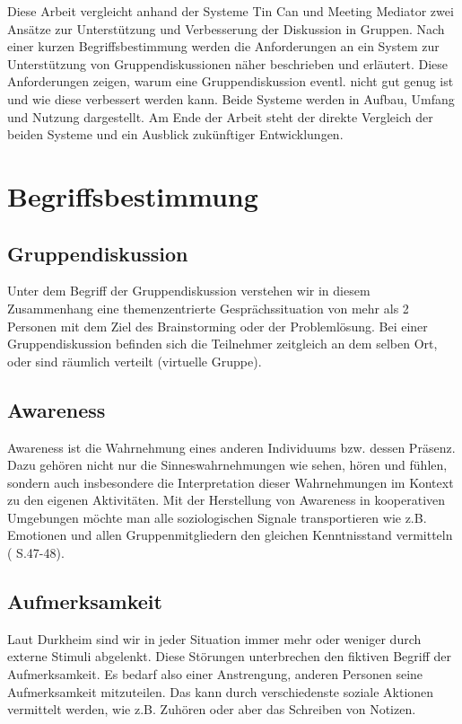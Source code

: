 \documentclass{seminarvorlage}
\begin{document}
Diese Arbeit vergleicht anhand der Systeme Tin Can \cite{HarGorSch2012} und
Meeting Mediator \cite{KimChaHolPent2008} zwei Ansätze zur Unterstützung und
Verbesserung der Diskussion in Gruppen.
Nach einer kurzen Begriffsbestimmung werden die Anforderungen an ein System zur
Unterstützung von Gruppendiskussionen näher beschrieben und erläutert. Diese
Anforderungen zeigen, warum eine Gruppendiskussion eventl.
nicht gut genug ist und wie diese verbessert werden kann. Beide Systeme werden
in Aufbau, Umfang und Nutzung dargestellt. Am Ende der Arbeit steht der
direkte Vergleich der beiden Systeme und ein Ausblick zu\-künf\-ti\-ger
Entwicklungen.


\section{Begriffsbestimmung}
\subsection{Gruppendiskussion}
Unter dem Begriff der Gruppendiskussion verstehen wir in diesem Zusammenhang
eine themenzentrierte Ge\-sprächs\-situa\-tion von mehr als 2 Personen mit dem
Ziel des Brainstorming oder der Problemlösung. Bei einer Gruppendiskussion befinden
sich die Teilnehmer zeitgleich an dem selben Ort, oder sind räumlich verteilt
(virtuelle Gruppe).

\subsection{Awareness}
Awareness ist die Wahrnehmung eines anderen Individuums bzw. dessen Präsenz.
Dazu gehören nicht nur die Sinneswahrnehmungen wie sehen, hören und fühlen,
sondern auch insbesondere die Interpretation dieser Wahrnehmungen im Kontext zu
den eigenen Aktivitäten.
Mit der Herstellung von Awareness in kooperativen Umgebungen mö\-chte man alle
soziologischen Signale transportieren wie z.B. Emotionen und allen
Gruppenmitgliedern den gleichen Kenntnisstand vermitteln (\cite{SchuLuk2007} S.47-48).

\subsection{Aufmerksamkeit}
Laut Durkheim \cite{Dur1974} sind wir in jeder Situation immer mehr oder weniger
durch externe Stimuli abgelenkt. Diese Stör\-un\-gen unterbrechen den fiktiven
Begriff der Aufmerksamkeit. Es bedarf also einer Anstrengung, anderen Personen
seine Aufmerksamkeit mitzuteilen. Das kann durch verschiedenste soziale Aktionen
vermittelt werden, wie z.B. Zuhören oder aber das Schreiben von Notizen.
\end{document}

